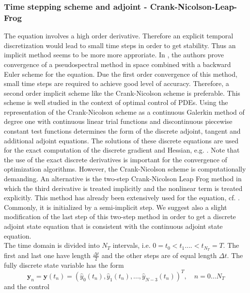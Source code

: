 \subsubsection{Time stepping scheme and adjoint - Crank-Nicolson-Leap-Frog}
\label{numadjoint}
The \KdVB equation involves a high order derivative. Therefore an explicit temporal discretization would lead to small time steps in order to get stability. Thus an implicit method seems to be more more approriate. In \cite{li2000error}, the authors prove convergence of a pseudospectral method in space combined with a backward Euler scheme for the \KdV equation. Due the first order convergence of this method, small time steps are required to achieve good level of accuracy. Therefore, a second order implicit scheme like the Crank-Nicolson scheme is preferable. This scheme is well studied in the context of optimal control of PDEs. Using the representation of the Crank-Nicolson scheme as a continuous Galerkin method of degree one with continuous linear trial functions and discontinuous piecewise constant test functions determines the form of the discrete adjoint, tangent and additional adjoint equations. The solutions of these discrete equations are used for the exact computation of the discrete gradient and Hessian, e.g. \cite{meidner2007adaptive}. Note that the use of the exact discrete derivatives is important for the convergence of optimization algorithms. However, the Crank-Nicolson scheme is computationally demanding. An alternative is the two-step Crank-Nicolson Leap Frog method in which the third derivative is treated implicitly and the nonlinear term is treated explicitly. This method has already been extensively used for the \KdV equation, cf. \cite{shen2003new,ma2000legendre,ma2001optimal}.
Commonly, it is initialized by a semi-implicit step. We suggest also a slight modification of the last step of this two-step method in order to get a discrete adjoint state equation that is consistent with the continuous adjoint state equation.\\
The time domain is divided into $N_{T}$ intervals, i.e. $0 = t_0 < t_1....< t_{N_{T}} = T$. The first and last one have length $\frac{\Delta t}{2}$ and the other steps are of equal length $\Delta t$. The fully discrete state variable has the form
$$\mathbf{y}_n = \mathbf{y}(t_n) = \left( \hat y_0(t_n), \hat y_1(t_n), ..., \hat y_{N-3}(t_n)\right)^T,  \quad  n=0 \ldots N_{T}$$ and the control

